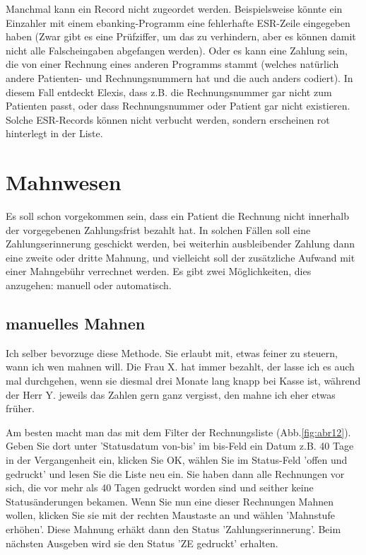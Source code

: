 \documentclass[a4paper]{scrartcl}
\begin{document}
\medskip

Manchmal kann ein Record nicht zugeordet werden. Beispielsweise könnte ein Einzahler mit einem ebanking-Programm eine fehlerhafte ESR-Zeile eingegeben haben (Zwar gibt es eine Prüfziffer, um das zu verhindern, aber es können damit nicht alle Falscheingaben abgefangen werden). Oder es kann eine Zahlung sein, die von einer Rechnung eines anderen Programms stammt (welches natürlich andere Patienten- und Rechnungsnummern hat und die auch anders codiert). In diesem Fall entdeckt Elexis, dass z.B. die Rechnungsnummer gar nicht zum Patienten passt, oder dass Rechnungsnummer oder Patient gar nicht existieren. Solche ESR-Records können nicht verbucht werden, sondern erscheinen rot hinterlegt in der Liste.

\section{Mahnwesen}
Es soll schon vorgekommen sein, dass ein Patient die Rechnung nicht innerhalb der vorgegebenen Zahlungsfrist bezahlt hat. In solchen Fällen soll eine Zahlungserinnerung geschickt werden, bei weiterhin ausbleibender Zahlung dann eine zweite oder dritte Mahnung, und vielleicht soll der zusätzliche Aufwand mit einer Mahngebühr verrechnet werden. Es gibt zwei Möglichkeiten, dies anzugehen: manuell oder automatisch.

\subsection{manuelles Mahnen}
Ich selber bevorzuge diese Methode. Sie erlaubt mit, etwas feiner zu steuern, wann ich wen mahnen will. Die Frau X. hat immer bezahlt, der lasse ich es auch mal durchgehen, wenn sie diesmal drei Monate lang knapp bei Kasse ist, während der Herr Y. jeweils das Zahlen gern ganz vergisst, den mahne ich eher etwas früher.

\medskip

Am besten macht man das mit dem Filter der Rechnungsliste (Abb.\ref{fig:abr12}). Geben Sie dort unter 'Statusdatum von-bis' im bis-Feld ein Datum z.B. 40 Tage in der Vergangenheit ein, klicken Sie OK, wählen Sie im Status-Feld 'offen und gedruckt' und lesen Sie die Liste neu ein. Sie haben dann alle Rechnungen vor sich, die vor mehr als 40 Tagen gedruckt worden sind und seither keine Statusänderungen bekamen. Wenn Sie nun eine dieser Rechnungen Mahnen wollen, klicken Sie sie mit der rechten Maustaste an und wählen 'Mahnstufe erhöhen'. Diese Mahnung erhäkt dann den Status 'Zahlungserinnerung'. Beim nächsten Ausgeben wird sie den Status 'ZE gedruckt' erhalten.
\end{document}
